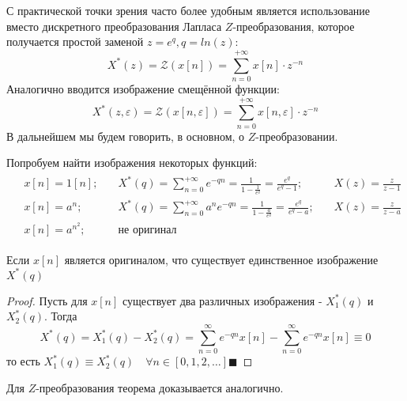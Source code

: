 \documentclass[12pt,twoside]{report}
\theoremstyle{MyNonumberplain}
\begin{document}
    
            С практической точки зрения часто более удобным является использование вместо
            дискретного преобразования Лапласа $Z$-преобразования, которое получается
            простой заменой $z=e^q, q=ln(z)$:
            \begin{equation}\label{Ztransform}
                X^*(z)= \mathcal{Z}(x[n])=\sum_{n=0}^{+\infty} x[n] \cdot z^{-n}
            \end{equation}
            Аналогично вводится изображение смещённой функции:
            \begin{equation*}
                X^*(z,\varepsilon)=\mathcal{Z}(x[n,\varepsilon])=\sum_{n=0}^{+\infty} x[n,\varepsilon] \cdot z^{-n}
            \end{equation*}
            В дальнейшем мы будем говорить, в основном, о $Z$-преобразовании.
    
            Попробуем найти изображения некоторых функций:
            \begin{eqnarray*}
                \begin{split}
                    &x[n] = 1[n];\quad &X^*(q)=\sum^{+\infty}_{n=0} e^{-qn}=\frac{1}{1-\frac{1}{e^q}}=\frac{e^q}{e^q-1};
                    \quad &X(z)=\frac{z}{z-1}\\
                    &x[n] = a^n;\quad &X^*(q)=\sum^{+\infty}_{n=0} a^ne^{-qn}=\frac{1}{1-\frac{a}{e^q}}=\frac{e^q}{e^q-a};
                    \quad &X(z)=\frac{z}{z-a}\\
                    &x[n] = a^{n^2};\quad &\textit{не оригинал}\quad&
                \end{split}
            \end{eqnarray*}
    
            \begin{theorem}
                Если $x[n]$ является оригиналом, что существует единственное изображение
                $X^*(q)$
            \end{theorem}
            \begin{proof}
                Пусть для $x[n]$ существует два различных изображения - $X^*_1(q)$ и $X^*_2(q)$.
                Тогда 
                \begin{equation}
                    X^*(q)=X^*_1(q)-X^*_2(q) = \sum_{n=0}^{\infty}e^{-qn}x[n]-\sum_{n=0}^{\infty}e^{-qn}x[n] \equiv 0
                \end{equation}
                то есть $X^*_1(q) \equiv X^*_2(q) \quad \forall n \in [0,1,2,\dots] \blacksquare$
            \end{proof}
            Для $Z$-преобразования теорема доказывается аналогично.
    
\end{document}

